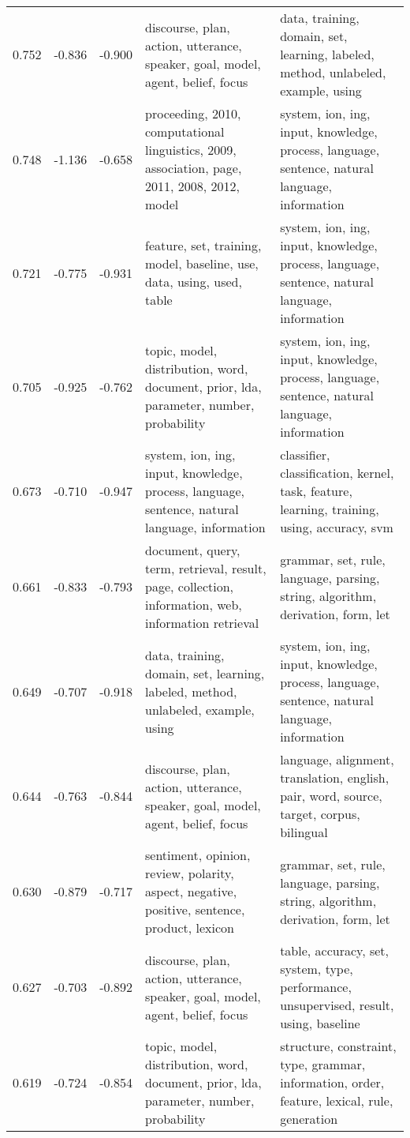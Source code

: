 \begin{tabular}{cccp{5cm}p{5cm}}
0.752 & -0.836 & -0.900 & discourse, plan, action, utterance, speaker, goal, model, agent, belief, focus & data, training, domain, set, learning, labeled, method, unlabeled, example, using \\
0.748 & -1.136 & -0.658 & proceeding, 2010, computational linguistics, 2009, association, page, 2011, 2008, 2012, model & system, ion, ing, input, knowledge, process, language, sentence, natural language, information \\
0.721 & -0.775 & -0.931 & feature, set, training, model, baseline, use, data, using, used, table & system, ion, ing, input, knowledge, process, language, sentence, natural language, information \\
0.705 & -0.925 & -0.762 & topic, model, distribution, word, document, prior, lda, parameter, number, probability & system, ion, ing, input, knowledge, process, language, sentence, natural language, information \\
0.673 & -0.710 & -0.947 & system, ion, ing, input, knowledge, process, language, sentence, natural language, information & classifier, classification, kernel, task, feature, learning, training, using, accuracy, svm \\
0.661 & -0.833 & -0.793 & document, query, term, retrieval, result, page, collection, information, web, information retrieval & grammar, set, rule, language, parsing, string, algorithm, derivation, form, let \\
0.649 & -0.707 & -0.918 & data, training, domain, set, learning, labeled, method, unlabeled, example, using & system, ion, ing, input, knowledge, process, language, sentence, natural language, information \\
0.644 & -0.763 & -0.844 & discourse, plan, action, utterance, speaker, goal, model, agent, belief, focus & language, alignment, translation, english, pair, word, source, target, corpus, bilingual \\
0.630 & -0.879 & -0.717 & sentiment, opinion, review, polarity, aspect, negative, positive, sentence, product, lexicon & grammar, set, rule, language, parsing, string, algorithm, derivation, form, let \\
0.627 & -0.703 & -0.892 & discourse, plan, action, utterance, speaker, goal, model, agent, belief, focus & table, accuracy, set, system, type, performance, unsupervised, result, using, baseline \\
0.619 & -0.724 & -0.854 & topic, model, distribution, word, document, prior, lda, parameter, number, probability & structure, constraint, type, grammar, information, order, feature, lexical, rule, generation \\

\end{tabular}
